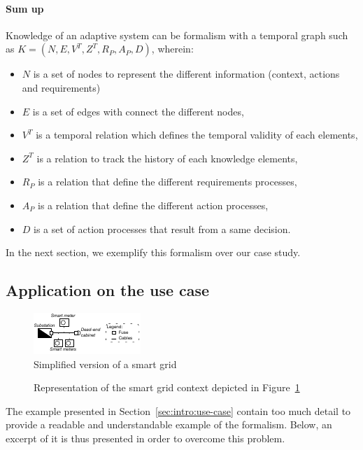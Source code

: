 \paragraph{Sum up}
Knowledge of an adaptive system can be formalism with a temporal graph such as $K = (N, E, V^T, Z^T, R_P, A_P, D)$, wherein:
\begin{itemize}
	\item $N$ is a set of nodes to represent the different information (context, actions and requirements)
	\item $E$ is a set of edges with connect the different nodes,
	\item $V^T$ is a temporal relation which defines the temporal validity of each elements,
	\item $Z^T$ is a relation to track the history of each knowledge elements,
	\item $R_P$ is a relation that define the different requirements processes,
	\item $A_P$ is a relation that define the different action processes,
	\item $D$ is a set of action processes that result from a same decision.
\end{itemize}

In the next section, we exemplify this formalism over our case study.


\subsection{Application on the use case}
\begin{figure}
	\centering
	\includegraphics[width=0.5\linewidth]{img/chapt-tkm/formalism/excerptSG}
	\caption{Simplified version of a smart grid}
	\label{fig:tkm:excerptSG}
\end{figure}

\begin{figure}
	\caption{Representation of the smart grid context depicted in Figure~\ref{fig:tkm:excerptSG}}
	\label{fig:tkm:contextFormExample}
\end{figure}


The example presented in Section~\ref{sec:intro:use-case} contain too much detail to provide a readable and understandable example of the formalism.
Below, an excerpt of it is thus presented in order to overcome this problem.


